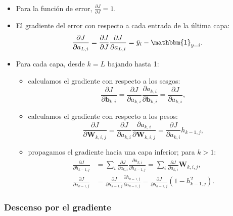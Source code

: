 \begin{itemize}
\item Para la función de error, $\frac{\partial J}{\partial J} = 1$.
\item El gradiente del error con respecto a cada entrada de la última capa:
  \begin{equation}
    \frac{\partial J}{\partial a_{L, i}} =
    \frac{\partial J}{\partial J} \frac{\partial J}{\partial a_{L, i}} =
    \hat{y}_i - \mathbbm{1}_{y=i}. \label{derivtanh}
  \end{equation}
\item Para cada capa, desde $k = L$ bajando hasta 1:
  \begin{itemize}
  \item calculamos el gradiente con respecto a los sesgos:
    \begin{equation}
      \frac{\partial J}{\partial \bm{b}_{k, i}} =
      \frac{\partial J}{\partial a_{k, i}} \frac{\partial a_{k, i}}{\partial \bm{b}_{k, i}} =
      \frac{\partial J}{\partial a_{k, i}}, \label{biasgradient}
    \end{equation}
  \item calculamos el gradiente con respecto a los pesos:
    \begin{equation}
      \frac{\partial J}{\partial \bm{W}_{k, i, j}} =
      \frac{\partial J}{\partial a_{k, i}} \frac{\partial a_{k, i}}{\partial \bm{W}_{k, i, j}} =
      \frac{\partial J}{\partial a_{k, i}} h_{k-1, j}, \label{biasgradient}
    \end{equation}
  \item propagamos el gradiente hacia una capa inferior; para $k > 1$:
    \begin{align}
      \frac{\partial J}{\partial h_{k-1, j}} &=
      \sum_i \frac{\partial J}{\partial a_{k, i}} \frac{\partial a_{k,i}}{\partial h_{k-1, j}} =
      \sum_i \frac{\partial J}{\partial a_{k,i}} \bm{W}_{k, i, j}, \label{hiddenbackprop}\\
      \frac{\partial J}{\partial a_{k-1, j}} &=
      \frac{\partial J}{\partial h_{k-1, j}} \frac{\partial h_{k-1, j}}{\partial a_{k-1, j}} =
      \frac{\partial J}{\partial h_{k-1, j}} (1 - h_{k-1, j}^2). \label{combbackprop}
    \end{align}
  \end{itemize}
\end{itemize}

\subsubsection{Descenso por el gradiente}
